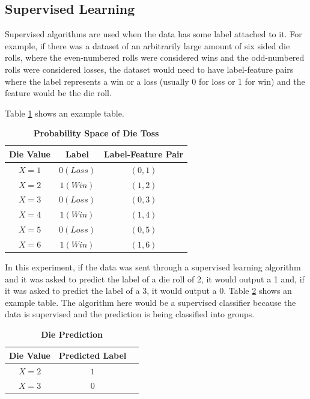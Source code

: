 \documentclass[9pt,twocolumn,twoside]{idsi}
\begin{document}
\subsection{Supervised Learning}
Supervised algorithms are used when the data has some label attached to it. For example, if there was a dataset of an arbitrarily large amount of six sided die rolls, where the even-numbered rolls were considered wins and the odd-numbered rolls were considered losses, the dataset would need to have label-feature pairs where the label represents a win or a loss (usually 0 for loss or 1 for win) and the feature would be the die roll.

 Table \ref{tab:Die-tosses} shows an example table. 
\begin{table}[htbp]
\centering
\caption{\bf Probability Space of Die Toss}
\begin{tabular}{ccc}
\hline
Die Value & Label & Label-Feature Pair \\
\hline
$X = 1$ & $0(Loss)$ & $(0,1)$ \\
$X = 2$ & $1(Win)$ & $(1,2)$ \\
$X = 3$ & $0(Loss)$ & $(0,3)$ \\
$X = 4$ & $1(Win)$ & $(1,4)$ \\
$X = 5$ & $0(Loss)$ & $(0,5)$ \\
$X = 6$ & $1(Win)$ & $(1,6)$ \\
\hline
\end{tabular}
  \label{tab:Die-tosses}
\end{table}

In this experiment, if the data was sent through a supervised learning algorithm and it was asked to predict the label of a die roll of 2, it would output a 1 and, if it was asked to predict the label of a 3, it would output a 0. Table \ref{tab:Die-predict} shows an example table. The algorithm here would be a supervised classifier because the data is supervised and the prediction is being classified into groups. 

\begin{table}[htbp]
\centering
\caption{\bf Die Prediction}
\begin{tabular}{ccc}
\hline
Die Value & Predicted Label \\
\hline
$X = 2$ & $1$ \\
$X = 3$ & $0$ \\
\hline
\end{tabular}
  \label{tab:Die-predict}
\end{table}
\end{document}
